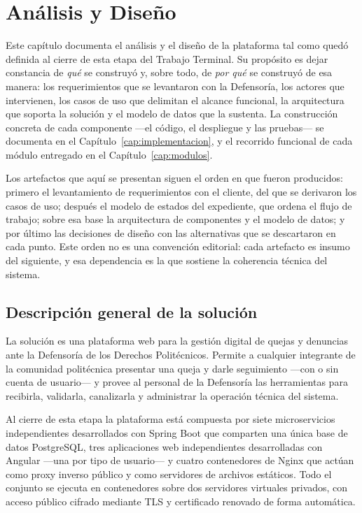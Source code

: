 	\section{Análisis y Diseño}
	\label{cap:analisis_diseno}
	Este capítulo documenta el análisis y el diseño de la plataforma tal como quedó definida al
	cierre de esta etapa del Trabajo Terminal. Su propósito es dejar constancia de \emph{qué} se
	construyó y, sobre todo, de \emph{por qué} se construyó de esa manera: los requerimientos que
	se levantaron con la Defensoría, los actores que intervienen, los casos de uso que delimitan
	el alcance funcional, la arquitectura que soporta la solución y el modelo de datos que la
	sustenta. La construcción concreta de cada componente ---el código, el despliegue y las
	pruebas--- se documenta en el Capítulo~\ref{cap:implementacion}, y el recorrido funcional de
	cada módulo entregado en el Capítulo~\ref{cap:modulos}.
	
	Los artefactos que aquí se presentan siguen el orden en que fueron producidos: primero el
	levantamiento de requerimientos con el cliente, del que se derivaron los casos de uso; después
	el modelo de estados del expediente, que ordena el flujo de trabajo; sobre esa base la
	arquitectura de componentes y el modelo de datos; y por último las decisiones de diseño con
	las alternativas que se descartaron en cada punto. Este orden no es una convención editorial:
	cada artefacto es insumo del siguiente, y esa dependencia es la que sostiene la coherencia
	técnica del sistema.
	
	\subsection{Descripción general de la solución}
	\label{sec:descripcion_solucion}
	La solución es una plataforma web para la gestión digital de quejas y denuncias ante la
	Defensoría de los Derechos Politécnicos. Permite a cualquier integrante de la comunidad
	politécnica presentar una queja y darle seguimiento ---con o sin cuenta de usuario--- y provee
	al personal de la Defensoría las herramientas para recibirla, validarla, canalizarla y
	administrar la operación técnica del sistema.
	
	Al cierre de esta etapa la plataforma está compuesta por siete microservicios independientes
	desarrollados con Spring Boot que comparten una única base de datos PostgreSQL, tres
	aplicaciones web independientes desarrolladas con Angular ---una por tipo de usuario--- y
	cuatro contenedores de Nginx que actúan como proxy inverso público y como servidores de
	archivos estáticos. Todo el conjunto se ejecuta en contenedores sobre dos servidores virtuales
	privados, con acceso público cifrado mediante TLS y certificado renovado de forma automática.
	
